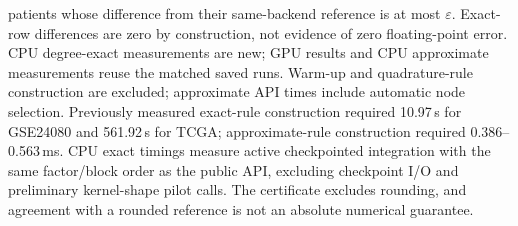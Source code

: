 \begin{table}[t]
{patients whose difference from their same-backend reference is at most
$\varepsilon$. Exact-row differences are zero by construction, not evidence
of zero floating-point error. CPU degree-exact measurements are new;
GPU results and CPU approximate measurements reuse the matched saved runs.
Warm-up and quadrature-rule construction are excluded; approximate API
times include automatic node selection. Previously measured exact-rule
construction required 10.97\,s for GSE24080 and 561.92\,s for TCGA;
approximate-rule construction required 0.386--0.563\,ms.
CPU exact timings measure active
checkpointed integration with the same factor/block order as the public
API, excluding checkpoint I/O and preliminary kernel-shape pilot calls.
The certificate excludes rounding,
and agreement with a rounded reference is not an absolute numerical guarantee.}
\label{tab:cox-device-exact}
\end{table}
